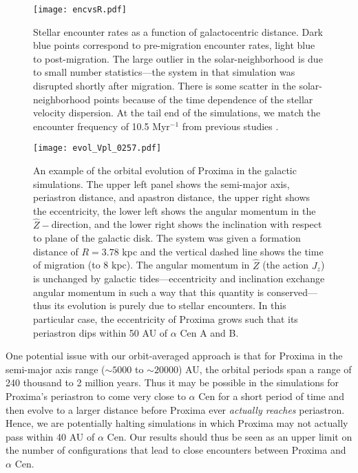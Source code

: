 \documentclass[preprint,12pt]{aastex}
\begin{document}
\begin{figure}
\centering
\texttt{[image: encvsR.pdf]}
\caption{Stellar encounter rates as a function of galactocentric distance.
  Dark blue points correspond to pre-migration encounter rates, light 
  blue to post-migration. The large outlier in the 
  solar-neighborhood is due to small number statistics---the system 
  in that simulation was disrupted shortly after migration. There is some 
  scatter in the solar-neighborhood points because of the time dependence 
  of the stellar velocity dispersion. At the tail end of the simulations, we 
  match the encounter frequency of 10.5 Myr$^{-1}$ from previous 
  studies \citep{Garciasanchez2001,Rickman2008}.}
\label{fig:encrates}
\end{figure}


\begin{figure}
\texttt{[image: evol\_Vpl\_0257.pdf]}
\caption{An example of the orbital evolution of Proxima in the galactic 
  simulations. The upper left panel shows the semi-major axis, periastron 
  distance, and apastron distance, the upper right shows the eccentricity, 
  the lower left shows the angular momentum in the $\hat{Z}-$direction, 
  and the lower right shows the inclination with respect to plane of the 
  galactic disk. The system was given a formation distance of $R = 3.78$ 
  kpc and the vertical dashed line shows the time of migration (to 8 kpc). 
  The angular momentum in $\hat{Z}$ (the action $J_z$) is unchanged by 
  galactic tides---eccentricity and inclination exchange angular momentum 
  in such a way that this quantity is conserved---thus its evolution is purely 
  due to stellar encounters. In this particular case, the eccentricity of Proxima 
  grows such that its periastron dips within 50 AU of $\alpha$ Cen A and B.}
\label{fig:galevolution}
\end{figure}

One potential issue with our orbit-averaged approach is that for Proxima in the 
semi-major axis range ($\sim5000$ to $\sim20000$) AU, the orbital periods 
span a range of 240 thousand to 2 million years. Thus it may be possible in 
the simulations for Proxima's periastron to come very close to $\alpha$ Cen 
for a short period of time and then evolve to a larger distance before Proxima 
ever \emph{actually reaches} periastron. Hence, we are potentially halting 
simulations in which 
Proxima may not actually pass within 40 AU of $\alpha$ Cen. Our results 
should thus be seen as an upper limit on the number of configurations 
that lead to close encounters between Proxima and $\alpha$ Cen.
 
\end{document}
